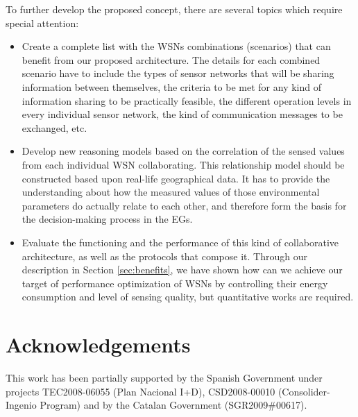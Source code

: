 \documentclass[onecolumn]{jaise2e}
\begin{document}
To further develop the proposed concept, there are several topics which require special attention:

\begin{itemize}
	\item Create a complete list with the WSNs combinations (scenarios) that can benefit from our proposed architecture. The details for each combined scenario have to include the types of sensor networks that will be sharing information between themselves, the criteria to be met for any kind of information sharing to be practically feasible, the different operation levels in every individual sensor network, the kind of communication messages to be exchanged, etc.	
	\item Develop new reasoning models based on the correlation of the sensed values from each individual WSN collaborating. This relationship model should be constructed based upon real-life geographical data. It has to provide the understanding about how the measured values of those environmental parameters do actually relate to each other, and therefore form the basis for the decision-making process in the EGs. 	
	\item Evaluate the functioning and the performance of this kind of collaborative architecture, as well as the protocols that compose it. Through our description in Section \ref{sec:benefits}, we have shown how can we achieve our target of performance optimization of WSNs by controlling their energy consumption and level of sensing quality, but quantitative works are required. 
\end{itemize}





\section*{Acknowledgements}

This work has been partially supported by the Spanish Government under projects TEC2008-06055 (Plan Nacional I+D), CSD2008-00010 (Consolider-Ingenio Program) and by the Catalan Government (SGR2009\#00617).
\end{document}
